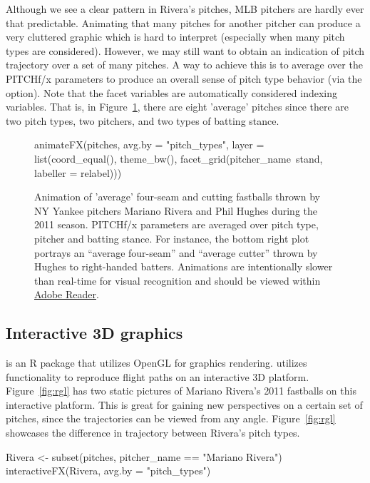 \begin{article}
Although we see a clear pattern in Rivera's pitches, MLB pitchers
are hardly ever that predictable. Animating that many pitches for
another pitcher can produce a very cluttered graphic which is hard
to interpret (especially when many pitch types are considered). However,
we may still want to obtain an indication of pitch trajectory over
a set of many pitches. A way to achieve this is to average over the
PITCHf/x parameters to produce an overall sense of pitch type behavior
(via the  option). Note that the facet variables are
automatically considered indexing variables. That is, in Figure~\ref{fig:animate2},
there are eight 'average' pitches since there are two pitch types,
two pitchers, and two types of batting stance.

\begin{figure}[h]
%
\begin{Schunk}
\begin{Sinput}
animateFX(pitches, avg.by = "pitch_types", layer = list(coord_equal(), theme_bw(),
  facet_grid(pitcher_name~stand, labeller = relabel)))
\end{Sinput}

\end{Schunk}
%

\caption{\label{fig:animate2}Animation of 'average' four-seam and cutting
fastballs thrown by NY Yankee pitchers Mariano Rivera and Phil Hughes
during the 2011 season. PITCHf/x parameters are averaged over pitch
type, pitcher and batting stance. For instance, the bottom right plot
portrays an ``average four-seam'' and ``average cutter'' thrown
by Hughes to right-handed batters. Animations are intentionally slower
than real-time for visual recognition and should be viewed within
\protect\href{http://get.adobe.com/reader/}{Adobe Reader}.}
\end{figure}



\subsection{Interactive 3D graphics}

 is an R package that utilizes OpenGL for graphics rendering.
 utilizes  functionality to reproduce
flight paths on an interactive 3D platform. Figure~\ref{fig:rgl}
has two static pictures of Mariano Rivera's 2011 fastballs on this
interactive platform. This is great for gaining new perspectives on
a certain set of pitches, since the trajectories can be viewed from
any angle. Figure~\ref{fig:rgl} showcases the difference in trajectory
between Rivera's pitch types.
%
\begin{Schunk}
\begin{Sinput}
Rivera <- subset(pitches, pitcher_name == "Mariano Rivera")
interactiveFX(Rivera, avg.by = "pitch_types")
\end{Sinput}
\end{Schunk}
%


\end{article}
